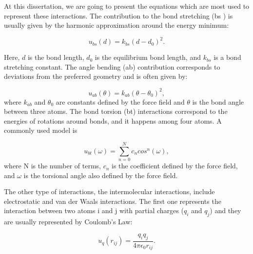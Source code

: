 At this dissertation, we are going to present the equations which are most used to represent these interactions. The contribution to the bond stretching (bs ) is usually given by the harmonic approximation around the energy minimum:

\begin{equation}
u_{bs}(d) = k_{bs} (d - d_{0})^2 .
\end{equation}

Here, $d$ is the bond length, $d_{0}$ is the equilibrium bond length, and $k_{bs}$ is a bond stretching constant. The angle bending (ab) contribution corresponds to deviations from the preferred geometry and is often given by:

\begin{equation}
u_{ab}(\theta) = k_{ab} (\theta - \theta _{0})^2,
\end{equation}
where $k_{ab}$ and $\theta _{0}$ are constants defined by the force field and $\theta$ is the bond angle between three atoms.  The bond torsion (bt) interactions correspond to the energies of rotations around bonds, and it happens among four atoms. A commonly used model is

\begin{equation}
u_{bt}(\omega) = \sum_{n=0}^{N}  c_{n} cos^{n} (\omega) ,
\end{equation}
where N is the number of terms, $c_{n}$ is the coefficient defined by the force field, and $\omega$ is the torsional angle also defined by the force field. 

The other type of interactions, the intermolecular interactions, include electrostatic and van der Waals interactions. The first one represents the interaction between two atoms i and j with partial charges ($q_{i}$ and $q_{j}$) and they are usually represented by Coulomb's Law:

\begin{equation}
u_{q}(r_{ij}) = \frac{q_{i}q_{j}}{4 \pi \epsilon _{0} r_{ij}} .
\end{equation} 

